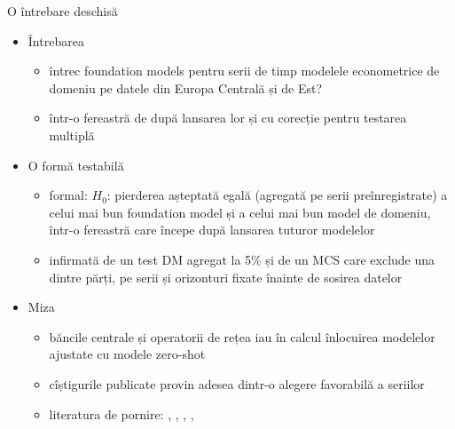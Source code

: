\begin{frame}{O întrebare deschisă}
\itemsize{\small}
\begin{itemize}
    \item Întrebarea
    \begin{itemize}
        \item întrec foundation models pentru serii de timp modelele econometrice de domeniu pe datele din Europa Centrală și de Est?
        \item într-o fereastră de după lansarea lor și cu corecție pentru testarea multiplă
    \end{itemize}
    \item O formă testabilă
    \begin{itemize}
        \item formal: $H_0$: pierderea așteptată egală (agregată pe serii preînregistrate) a celui mai bun foundation model și a celui mai bun model de domeniu, într-o fereastră care începe după lansarea tuturor modelelor
        \item infirmată de un test DM agregat la 5\% și de un MCS care exclude una dintre părți, pe serii și orizonturi fixate înainte de sosirea datelor
    \end{itemize}
    \item Miza
    \begin{itemize}
        \item băncile centrale și operatorii de rețea iau în calcul înlocuirea modelelor ajustate cu modele zero-shot
        \item cîștigurile publicate provin adesea dintr-o alegere favorabilă a seriilor
        \item literatura de pornire: , , , , 
    \end{itemize}
\end{itemize}
\end{frame}

